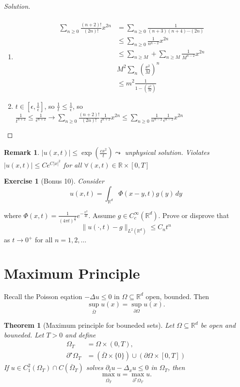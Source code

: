 \documentclass{report}
\theoremstyle{tommy}
\newtheorem{thm}[defn]{Theorem}
\newtheorem{rem}[defn]{Remark}
\newtheorem{ex}[defn]{Exercise}
\begin{document}
\begin{proof}[Solution]
\begin{align*}
    \end{align*}
    \begin{enumerate}[label=(\arabic*)]
      \item \begin{align*}
        \sum_{n \ge 0} \frac{(n+2)!}{(2n)!}x^{2n} &= \sum_{n \ge 0} \frac{1}{(n+3)(n+4)\cdots(2n)} \\
        &\le \sum_{n \ge 0} \frac{1}{n^{n-2}} x^{2n} \\
        &\le \sum_{n \ge M} + \sum_{n \ge M} \frac{1}{M^{n-2}} x^{2n} \\
        &M^2 \sum_n {\left(\frac{x^2}{M}\right)^n} \\
        &\le m^2 \frac{1}{1 - \left(\frac{x^2}{M}\right)}
      \end{align*}
      \item \(t \in [\epsilon, \frac{1}{\epsilon}]\), so \(\frac{1}{t} \le \frac{1}{\epsilon}\), so 
      \(\frac{1}{t^{n+2}} \le \frac{1}{\epsilon^{n+2}} \longrightarrow \sum_{n \ge 0} \frac{(n+2)!}{(2n)!} \frac{1}{t^{n+2}} x^{2n} \le \sum_{n \ge 0} \frac{1}{n^{n-2}} \frac{1}{\epsilon^{n-2}} x^{2n}\)
    \end{enumerate}
  \end{proof}

  \begin{rem}
    \(|u(x,t)| \le \exp \left(\frac{cx^2}{t}\right) \leadsto \) unphysical solution. Violates \(|u(x,t)| \le Ce^{C|x|^2}\) for all \(\forall (x,t) \in \mathbb{R} \times [0,T]\)
  \end{rem}

  \begin{ex}[Bonus 10]
    Consider 
    \[u(x,t) = \int_{\mathbb{R}^d} \Phi(x-y,t) g(y) \, dy\]
  \end{ex}
  where \(\Phi(x,t) = \frac{1}{(4 \pi t)^{\frac{d}{2}}}e^{-\frac{x^2}{4t}}\). Assume \(g \in C_c^\infty(\mathbb{R}^d)\). Prove or disprove that 
  \[\|u(\cdot, t)-g\|_{L^2(\mathbb{R}^d)} \le C_nt^n\]
  as \(t \to 0^+\) for all \(n = 1,2,\dots\)
  

  \section{Maximum Principle}

  Recall the Poisson eqation \(-\Delta u \le 0\) in \(\Omega \subseteq \mathbb{R}^d\) open, bounded. Then 
  \[\sup_{\bar \Omega} u(x) = \sup_{\partial \Omega} u(x).\]

  
  \begin{thm}[Maximum principle for bouneded sets]
    Let \(\Omega \subseteq \mathbb{R}^d\) be open and bouneded. Let \(T > 0\) and define 
    \begin{align*}
      \Omega_T &= \Omega \times (0,T), \\
      \partial^\star \Omega_T &= (\bar \Omega \times \{0\}) \cup (\partial \Omega \times [0,T])
    \end{align*}
    If \(u \in C_1^2(\Omega_T) \cap C(\bar \Omega_T)\) solves 
    \(\partial_t u - \Delta_x u \le 0\)
    in \(\Omega_T\), then \[\max_{\overline{\Omega_T}} u = \max_{\partial^\star \Omega_T} u.\]
  \end{thm}
\end{document}
